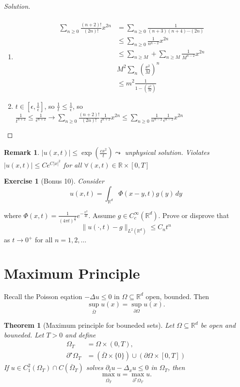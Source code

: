 \documentclass{report}
\theoremstyle{tommy}
\newtheorem{thm}[defn]{Theorem}
\newtheorem{rem}[defn]{Remark}
\newtheorem{ex}[defn]{Exercise}
\begin{document}
\begin{proof}[Solution]
\begin{align*}
    \end{align*}
    \begin{enumerate}[label=(\arabic*)]
      \item \begin{align*}
        \sum_{n \ge 0} \frac{(n+2)!}{(2n)!}x^{2n} &= \sum_{n \ge 0} \frac{1}{(n+3)(n+4)\cdots(2n)} \\
        &\le \sum_{n \ge 0} \frac{1}{n^{n-2}} x^{2n} \\
        &\le \sum_{n \ge M} + \sum_{n \ge M} \frac{1}{M^{n-2}} x^{2n} \\
        &M^2 \sum_n {\left(\frac{x^2}{M}\right)^n} \\
        &\le m^2 \frac{1}{1 - \left(\frac{x^2}{M}\right)}
      \end{align*}
      \item \(t \in [\epsilon, \frac{1}{\epsilon}]\), so \(\frac{1}{t} \le \frac{1}{\epsilon}\), so 
      \(\frac{1}{t^{n+2}} \le \frac{1}{\epsilon^{n+2}} \longrightarrow \sum_{n \ge 0} \frac{(n+2)!}{(2n)!} \frac{1}{t^{n+2}} x^{2n} \le \sum_{n \ge 0} \frac{1}{n^{n-2}} \frac{1}{\epsilon^{n-2}} x^{2n}\)
    \end{enumerate}
  \end{proof}

  \begin{rem}
    \(|u(x,t)| \le \exp \left(\frac{cx^2}{t}\right) \leadsto \) unphysical solution. Violates \(|u(x,t)| \le Ce^{C|x|^2}\) for all \(\forall (x,t) \in \mathbb{R} \times [0,T]\)
  \end{rem}

  \begin{ex}[Bonus 10]
    Consider 
    \[u(x,t) = \int_{\mathbb{R}^d} \Phi(x-y,t) g(y) \, dy\]
  \end{ex}
  where \(\Phi(x,t) = \frac{1}{(4 \pi t)^{\frac{d}{2}}}e^{-\frac{x^2}{4t}}\). Assume \(g \in C_c^\infty(\mathbb{R}^d)\). Prove or disprove that 
  \[\|u(\cdot, t)-g\|_{L^2(\mathbb{R}^d)} \le C_nt^n\]
  as \(t \to 0^+\) for all \(n = 1,2,\dots\)
  

  \section{Maximum Principle}

  Recall the Poisson eqation \(-\Delta u \le 0\) in \(\Omega \subseteq \mathbb{R}^d\) open, bounded. Then 
  \[\sup_{\bar \Omega} u(x) = \sup_{\partial \Omega} u(x).\]

  
  \begin{thm}[Maximum principle for bouneded sets]
    Let \(\Omega \subseteq \mathbb{R}^d\) be open and bouneded. Let \(T > 0\) and define 
    \begin{align*}
      \Omega_T &= \Omega \times (0,T), \\
      \partial^\star \Omega_T &= (\bar \Omega \times \{0\}) \cup (\partial \Omega \times [0,T])
    \end{align*}
    If \(u \in C_1^2(\Omega_T) \cap C(\bar \Omega_T)\) solves 
    \(\partial_t u - \Delta_x u \le 0\)
    in \(\Omega_T\), then \[\max_{\overline{\Omega_T}} u = \max_{\partial^\star \Omega_T} u.\]
  \end{thm}
\end{document}
